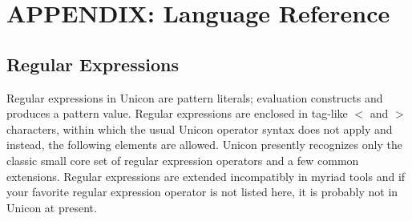 \documentclass[letterpaper,12pt]{article}
\begin{document}
%
%

\appendix

\section*{APPENDIX: Language Reference}
\thispagestyle{empty}

\subsection*{Regular Expressions}

Regular expressions in Unicon are pattern literals; evaluation
constructs and produces a pattern value.  Regular expressions
are enclosed in tag-like $<$ and $>$ characters, within which
the usual Unicon operator syntax does not apply and instead,
the following elements are allowed.  Unicon presently
recognizes only the classic small core set of regular
expression operators and a few common extensions.
Regular expressions are extended incompatibly in myriad tools and 
if your favorite regular expression operator is not listed here,
it is probably not in Unicon at present.
\end{document}
